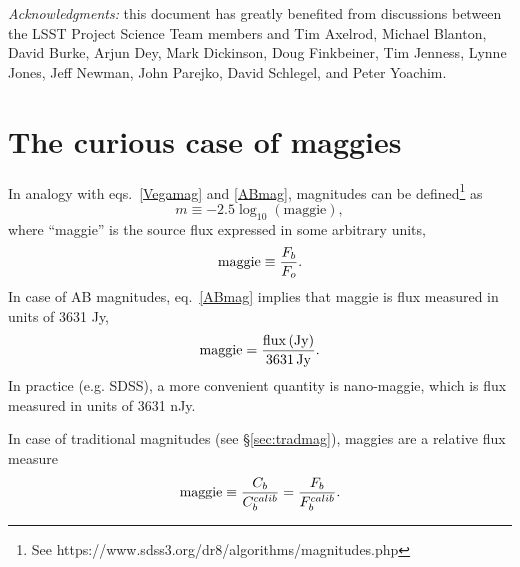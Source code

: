 \documentclass[DM,lsstdraft,toc,usenatbib]{lsstdoc}
\begin{document}
\vskip 0.0in
\newpage
\textit{Acknowledgments:} this document has greatly benefited from discussions between
the LSST Project Science Team members and Tim Axelrod, Michael Blanton, David
Burke, Arjun Dey, Mark Dickinson, Doug Finkbeiner, Tim Jenness, Lynne Jones,  Jeff Newman,
John Parejko, David Schlegel, and Peter Yoachim.



\appendix

\section{The curious case of maggies}

In analogy with eqs.~\ref{Vegamag} and \ref{ABmag}, magnitudes can be defined\footnote{
See https://www.sdss3.org/dr8/algorithms/magnitudes.php} as
\begin{equation}
\label{maggie}
               m \equiv - 2.5\log_{10}\left(\mathrm{maggie}\right),
\end{equation}
where ``maggie'' is the source flux expressed in some arbitrary
units,
\begin{equation}
\label{maggie2}
               \mathrm{maggie} \equiv {F_b \over F_o}.
\end{equation}
In case of AB magnitudes, eq.~\ref{ABmag} implies that maggie is
flux measured in units of 3631 Jy,
\begin{equation}
\label{eq:defmaggie}
           \mathrm{maggie} = {\mathrm{flux \, (Jy)} \over \mathrm{3631 \, Jy}}.
\end{equation}
In practice (e.g. SDSS), a more convenient
quantity is nano-maggie, which is flux measured in units of 3631 nJy.

In case of traditional magnitudes (see \S\ref{sec:tradmag}), maggies are a
relative flux measure
\begin{equation}
\label{maggie3}
    \mathrm{maggie} \equiv {C_b  \over C_b^{calib}} = {F_b  \over F_b^{calib}}.
\end{equation}
\end{document}
